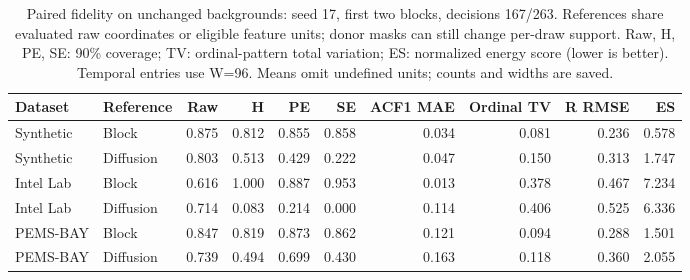 \begin{table}[t]\centering\small
\caption{Paired fidelity on unchanged backgrounds: seed 17, first two blocks, decisions 167/263. References share evaluated raw coordinates or eligible feature units; donor masks can still change per-draw support. Raw, H, PE, SE: 90\% coverage; TV: ordinal-pattern total variation; ES: normalized energy score (lower is better). Temporal entries use W=96. Means omit undefined units; counts and widths are saved.}\label{tab:fidelity}
\begin{tabular}{llrrrrrrrr}\toprule Dataset&Reference&Raw&H&PE&SE&ACF1 MAE&Ordinal TV&R RMSE&ES\\\midrule
Synthetic & Block & 0.875 & 0.812 & 0.855 & 0.858 & 0.034 & 0.081 & 0.236 & 0.578 \\
Synthetic & Diffusion & 0.803 & 0.513 & 0.429 & 0.222 & 0.047 & 0.150 & 0.313 & 1.747 \\
Intel Lab & Block & 0.616 & 1.000 & 0.887 & 0.953 & 0.013 & 0.378 & 0.467 & 7.234 \\
Intel Lab & Diffusion & 0.714 & 0.083 & 0.214 & 0.000 & 0.114 & 0.406 & 0.525 & 6.336 \\
PEMS-BAY & Block & 0.847 & 0.819 & 0.873 & 0.862 & 0.121 & 0.094 & 0.288 & 1.501 \\
PEMS-BAY & Diffusion & 0.739 & 0.494 & 0.699 & 0.430 & 0.163 & 0.118 & 0.360 & 2.055 \\
\bottomrule\end{tabular}\end{table}
